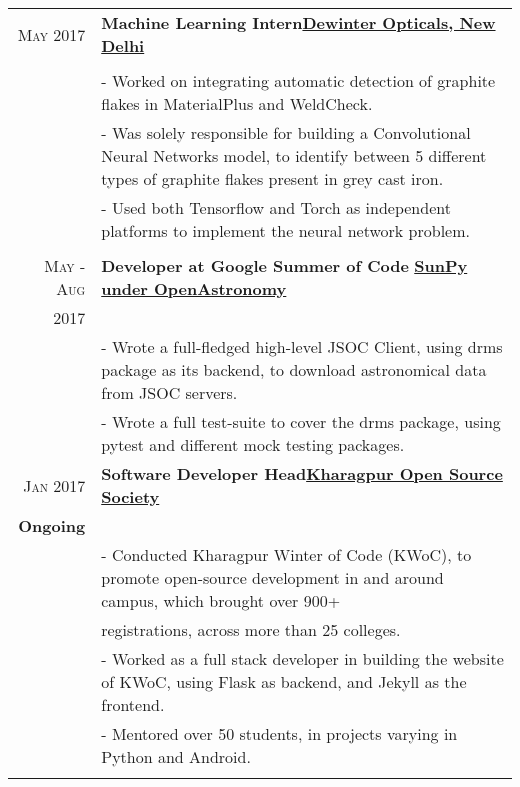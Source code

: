 \documentclass[a4paper,10pt]{extarticle} %
\begin{document}
\begin{tabular}{r|p{18cm}}

\textsc{May 2017} & \textbf{Machine Learning Intern}\hfill\textbf{\href{http://www.dewinterindia.com/}{Dewinter Opticals, New Delhi}}\\
\\
& \footnotesize{- Worked on integrating automatic detection of graphite flakes in MaterialPlus and WeldCheck.}\\
& \footnotesize{- Was solely responsible for building a Convolutional Neural Networks model, to identify between 5 different types of graphite flakes present in grey cast iron. }\\
& \footnotesize{- Used both Tensorflow and Torch as independent platforms to implement the neural network problem.
}\\
\multicolumn{2}{c}{} \\
\textsc{May - Aug} & \textbf{Developer at Google Summer of Code} \textsc\hfill\textbf{\href{http://sunpy.org/}{SunPy under OpenAstronomy}}\\
\textsc{2017}\\
& \footnotesize{- Wrote a full-fledged high-level JSOC Client, using drms package as its backend, to download astronomical data from JSOC servers.}\\
& \footnotesize{- Wrote a full test-suite to cover the drms package, using pytest and different mock testing packages. }
\multicolumn{2}{c}{} \\
\textsc{Jan 2017} & \textbf{Software Developer Head}\hfill\textbf{\href{http://kossiitkgp.in/}{Kharagpur Open Source Society}}\\
\textbf{Ongoing}\\
& \footnotesize{- Conducted Kharagpur Winter of Code (KWoC), to promote open-source development in and around campus, which brought over 900+}\\
& \footnotesize{registrations, across more than 25 colleges.
}\\
& \footnotesize{- Worked as a full stack developer in building the website of KWoC, using Flask as backend, and Jekyll as the frontend.}\\
& \footnotesize{- Mentored over 50 students, in projects varying in Python and Android.}\\
\multicolumn{2}{c}{} \\

\end{tabular}
\end{document}
